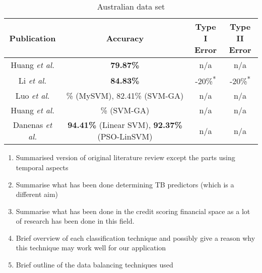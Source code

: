 \documentclass{sig-alternate-05-2015}
\begin{document}
	\begin{table}
		\small
		\caption{Australian data set\textsuperscript{\textparagraph}}
		\label{table:australian_dataset}	
		\begin{tabular}{c|c|c|c} \hline		
			Publication&Accuracy&\parbox[t]{1.2cm}{\centering Type I\\Error}&\parbox[t]{1.2cm}{\centering Type II\\Error}\rule{0pt}{3mm}\rule[-0mm]{0pt}{0pt}\\ \hline
			\parbox[t]{2.3cm}{Huang \textit{et al.} \cite{Huang2004543}}
			&\parbox[t]{2.3cm}{\centering \textbf{79.87\%}\textsuperscript{\textdagger}}
			&\parbox[t]{1.1cm}{\centering n/a}
			&\parbox[t]{1.2cm}{\centering n/a}\rule{0pt}{3.5mm}\rule[-0mm]{0pt}{0pt}\\ \hline
			\parbox[t]{2.3cm}{Li \textit{et al.} \cite{Li2006772}}
			&\parbox[t]{2.3cm}{\centering \textbf{84.83\%}}
			&\parbox[t]{1.1cm}{-20\%\textsuperscript{*}}
			&\parbox[t]{1.2cm}{-20\%\textsuperscript{*}}\\ \hline
			\parbox[t]{2.3cm}{Luo \textit{et al.} \cite{Luo20097562}}
			&\parbox[t]{2.3cm}{\% (MySVM), 82.41\% (SVM-GA)\textsuperscript{\textdagger}}
			&\parbox[t]{1.1cm}{\centering n/a}
			&\parbox[t]{1.2cm}{\centering n/a}\rule{0pt}{3.5mm}\rule[-0mm]{0pt}{0pt}\\ \hline
			\parbox[t]{2.3cm}{Huang \textit{et al.} \cite{Huang2007847}}
			&\parbox[t]{2.3cm}{\% (SVM-GA)\textsuperscript{\textdagger}}
			&\parbox[t]{1.1cm}{\centering n/a}
			&\parbox[t]{1.2cm}{\centering n/a}\rule{0pt}{3.5mm}\rule[-0mm]{0pt}{0pt}\\ \hline
			\parbox[t]{2.3cm}{Danenas \textit{et al.} \cite{Danenas20153194}}
			&\parbox[t]{2.3cm}{\centering \textbf{94.41\%} (Linear SVM), \textbf{92.37\%} (PSO-LinSVM)\textsuperscript{\textdagger}}
			&\parbox[t]{1.1cm}{\centering n/a\textsuperscript{\textdaggerdbl}}
			&\parbox[t]{1.2cm}{\centering n/a\textsuperscript{\textdaggerdbl}}\rule{0pt}{3.5mm}\rule[-8mm]{0pt}{0pt}		
		\end{tabular}		
	\end{table}
	
	\begin{enumerate}
		\item Summarised version of original literature review except the parts using temporal aspects
		\item Summarise what has been done determining TB predictors (which is a different aim)
		\item Summarise what has been done in the credit scoring financial space as a lot of research has been done in this field.
		\item Brief overview of each classification technique and possibly give a reason why this technique may work well for our application
		\item Brief outline of the data balancing techniques used
	\end{enumerate}
	
\end{document}
